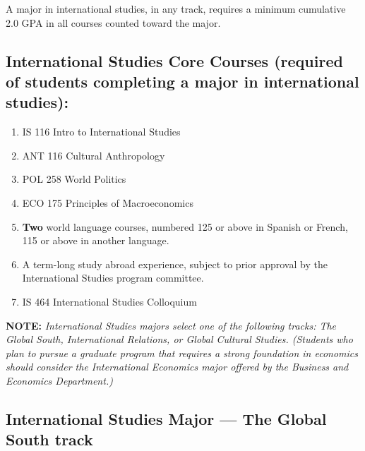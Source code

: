 \documentclass[
  letterpaper,
]{scrbook}
\providecommand{\tightlist}{%
  \setlength{\itemsep}{0pt}\setlength{\parskip}{0pt}}
\begin{document}
A major in international studies, in any track, requires a minimum
cumulative 2.0 GPA in all courses counted toward the major.

\subsection{International Studies Core Courses (required of students
completing a major in international
studies):}\label{international-studies-core-courses-required-of-students-completing-a-major-in-international-studies-1}

\begin{enumerate}
\def\labelenumi{\arabic{enumi}.}
\tightlist
\item
  IS 116 Intro to International Studies
\item
  ANT 116 Cultural Anthropology
\item
  POL 258 World Politics
\item
  ECO 175 Principles of Macroeconomics
\item
  \textbf{Two} world language courses, numbered 125 or above in Spanish
  or French, 115 or above in another language.
\item
  A term-long study abroad experience, subject to prior approval by the
  International Studies program committee.
\item
  IS 464 International Studies Colloquium
\end{enumerate}

\textbf{NOTE:} \emph{International Studies majors select one of the
following tracks: The Global South, International Relations, or Global
Cultural Studies. (Students who plan to pursue a graduate program that
requires a strong foundation in economics should consider the
International Economics major offered by the Business and Economics
Department.)}

\subsection{International Studies Major --- The Global South
track}\label{international-studies-major-the-global-south-track-1}
\end{document}
